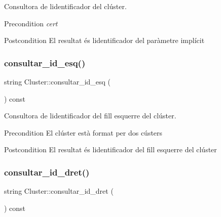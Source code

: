Consultora de l\textquotesingle{}identificador del clúster. 

\begin{DoxyPrecond}{Precondition}
{\itshape cert} 
\end{DoxyPrecond}
\begin{DoxyPostcond}{Postcondition}
El resultat és l\textquotesingle{}identificador del paràmetre implícit 
\end{DoxyPostcond}
\mbox{\label{class_cluster_ab9281dd9b122de1d367f8c01bad027dd}} 
\subsubsection{\texorpdfstring{consultar\+\_\+id\+\_\+esq()}{consultar\_id\_esq()}}
{\footnotesize\ttfamily string Cluster\+::consultar\+\_\+id\+\_\+esq (\begin{DoxyParamCaption}{ }\end{DoxyParamCaption}) const}



Consultora de l\textquotesingle{}identificador del fill esquerre del clúster. 

\begin{DoxyPrecond}{Precondition}
El clúster està format per dos cústers 
\end{DoxyPrecond}
\begin{DoxyPostcond}{Postcondition}
El resultat és l\textquotesingle{}identificador del fill esquerre del clúster 
\end{DoxyPostcond}
\mbox{\label{class_cluster_a52cb76611eb859cf14f8ad3bba54d994}} 
\subsubsection{\texorpdfstring{consultar\+\_\+id\+\_\+dret()}{consultar\_id\_dret()}}
{\footnotesize\ttfamily string Cluster\+::consultar\+\_\+id\+\_\+dret (\begin{DoxyParamCaption}{ }\end{DoxyParamCaption}) const}



